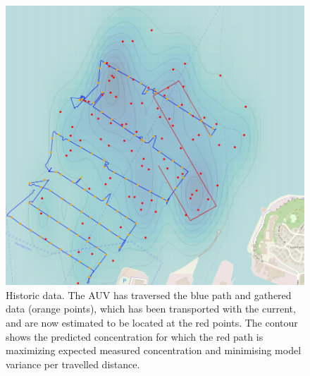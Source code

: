 \documentclass[conference]{IEEEtran}
\begin{document}
\begin{figure}[tbp]
  \centering
  \includegraphics[width=\linewidth]{figures/munkholmen_planned_path.png}
  \caption{Historic data. The AUV has traversed the blue path and gathered data (orange points), which has been transported with the current, and are now
    estimated to be located at the red points.  The contour shows the
    predicted concentration for which the red path is maximizing
    expected measured concentration and minimising model variance per travelled distance.}
  \label{fig:munkholmen}
\end{figure}
\end{document}
